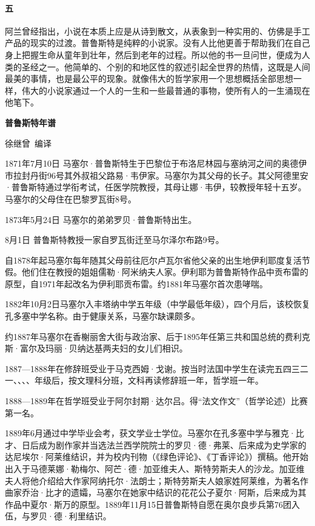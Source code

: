 \paragraph*{五}
\par 阿兰曾经指出，小说在本质上应是从诗到散文，从表象到一种实用的、仿佛是手工产品的现实的过渡。普鲁斯特是纯粹的小说家。没有人比他更善于帮助我们在自己身上把握生命从童年到壮年，然后到老年的过程。所以他的书一旦问世，便成为人类的圣经之一。他简单的、个别的和地区性的叙述引起全世界的热情，这既是人间最美的事情，也是最公平的现象。就像伟大的哲学家用一个思想概括全部思想一样，伟大的小说家通过一个人的一生和一些最普通的事物，使所有人的一生涌现在他笔下。
\\ 
\par \textbf{普鲁斯特年谱}
\begin{center}
    \par 徐继曾\ 编译
\end{center}
\par 1871年7月10日 马塞尔·普鲁斯特生于巴黎位于布洛尼林园与塞纳河之间的奥德伊市拉封丹街96号其外叔祖父路易·韦伊家。马塞尔为其父母的长子。其父阿德里安·普鲁斯特通过学衔考试，任医学院教授，其母让娜·韦伊，较教授年轻十五岁。马塞尔的父母住在巴黎罗瓦街8号。
\par 1873年5月24日 马塞尔的弟弟罗贝·普鲁斯特出生。
\par 8月1日 普鲁斯特教授一家自罗瓦街迁至马尔泽尔布路9号。
\par 自1878年起马塞尔每年随其父母前往厄尔卢瓦尔省他父亲的出生地伊利耶度复活节假。他们住在教授的姐姐儒勒·阿米纳夫人家。伊利耶为普鲁斯特作品中贡布雷的原型，自1971年起改名为伊利耶贡布雷。约1881年马塞尔首次患哮喘。
\par 1882年10月2日马塞尔入丰塔纳中学五年级（中学最低年级），四个月后，该校恢复孔多塞中学名称。由于健康关系，马塞尔缺课颇多。
\par 约1887年马塞尔在香榭丽舍大街与政治家、后于1895年任第三共和国总统的费利克斯·富尔及玛丽·贝纳达基两夫妇的女儿们相识。
\par 1887—1888年在修辞班受业于马克西姆·戈谢。按当时法国中学生在读完五四三二一、、、、年级后，按文理科分班，文科再读修辞班一年，哲学班一年。
\par 1888—1889年在哲学班受业于阿尔封期·达尔吕。得“法文作文”（哲学论述）比赛第一名。
\par 1889年6月通过中学毕业会考，获文学业士学位。马塞尔在孔多塞中学与雅克·比才、日后成为剧作家并当选法兰西学院院士的罗贝·德·弗莱、后来成为史学家的达尼埃尔·阿莱维结识，并为校内刊物（《绿色评论》、《丁香评论》）撰稿。他开始出入于马德莱娜·勒梅尔、阿芒·德·加亚维夫人、斯特劳斯夫人的沙龙。加亚维夫人将他介绍给大作家阿纳托尔·法朗士；斯特劳斯夫人娘家姓阿莱维，为著名作曲家乔治·比才的遗孀，马塞尔在她家中结识的花花公子夏尔·阿斯，后来成为其作品中夏尔·斯万的原型。1889年11月15日普鲁斯特自愿在奥尔良步兵第76团入伍，与罗贝·德·利里结识。

